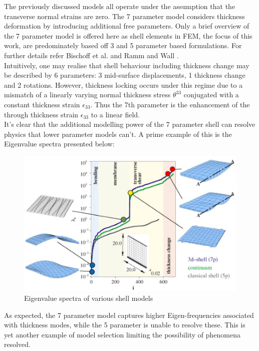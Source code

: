 The previously discussed models all operate under the assumption that the transverse normal strains are zero. The 7 parameter model considers thickness deformation by introducing additional free parameters. Only a brief overview of the 7 parameter model is offered here as shell elements in FEM, the focus of this work, are predominately based off 3 and 5 parameter based formulations. For further details refer Bischoff et al. \cite{BischLitBook04} and Ramm and Wall \cite{RammLitBook04}. \\

Intuitively, one may realise that shell behaviour including thickness change may be described by 6 parameters:  3 mid-surface displacements, 1 thickness change and 2 rotations.  However, thickness locking occurs under this regime due to a mismatch of a linearly varying normal thickness stress $\theta^{33}$ conjugated with a constant thickness strain $\epsilon_{33}$. Thus the 7th parameter is the enhancement of the through thickness strain $\epsilon_{33}$ to a linear field. \\

It's clear that the additional modelling power of the 7 parameter shell can resolve physics that lower parameter models can't. A prime example of this is the Eigenvalue spectra presented below:

\begin{figure}[H]
	\centering
	\def\svgwidth{\columnwidth}
	\includegraphics[width=12cm]{images/eigenvaluespectra.png}
	\caption{Eigenvalue spectra of various shell models \cite{RammLitBook04}}
	\label{shelleigenvaluespectra}
\end{figure}

As expected, the 7 parameter model captures higher Eigen-frequencies associated with thickness modes, while the 5 parameter is unable to resolve these. This is yet another example of model selection limiting the possibility of phenomena resolved.

